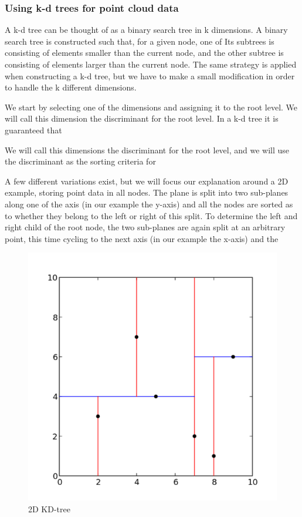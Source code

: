 \subsubsection{Using k-d trees for point cloud data} %
\label{ssub:using_k_d_trees_for_point_cloud_data}

A k-d tree can be thought of as a binary search tree in k dimensions. A binary search tree is constructed such that, for a given node, one of Its subtrees is consisting of elements smaller than the current node, and the other subtree is consisting of elements larger than the current node. The same strategy is applied when constructing a k-d tree, but we have to make a small modification in order to handle the k different dimensions.

We start by selecting one of the dimensions and assigning it to the root level. We will call this dimension the discriminant for the root level. In a k-d tree it is guaranteed that 

We will call this dimensions the discriminant for the root level, and we will use the discriminant as the sorting criteria for 






A few different variations exist, but we will focus our explanation around a 2D example, storing point data in all nodes. The plane is split into two sub-planes along one of the axis (in our example the y-axis) and all the nodes are sorted as to whether they belong to the left or right of this split. To determine the left and right child of the root node, the two sub-planes are again split at an arbitrary point, this time cycling to the next axis (in our example the x-axis) and the

\begin{figure}[ht!]
\centering
\includegraphics[width=120mm]{../gfx/Kdtree_2d.png}

\caption{2D KD-tree}
\label{fig:kdtree_2d}
\end{figure}

